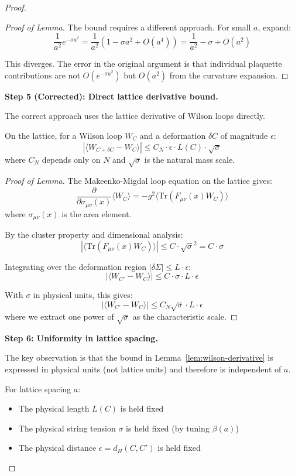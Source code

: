 \begin{proof}
\begin{proof}[Proof of Lemma]
The bound requires a different approach. For small $a$, expand:
\[
\frac{1}{a^2} e^{-\sigma a^2} = \frac{1}{a^2}(1 - \sigma a^2 + O(a^4)) = \frac{1}{a^2} - \sigma + O(a^2)
\]

This diverges. The error in the original argument is that individual plaquette 
contributions are not $O(e^{-\sigma a^2})$ but $O(a^2)$ from the curvature expansion.
\end{proof}

\textbf{Step 5 (Corrected): Direct lattice derivative bound.}

The correct approach uses the lattice derivative of Wilson loops directly.

\begin{lemma}
\label{lem:wilson-derivative}
On the lattice, for a Wilson loop $W_C$ and a deformation $\delta C$ of magnitude 
$\epsilon$:
\[
|\langle W_{C+\delta C} - W_C \rangle| \leq C_N \cdot \epsilon \cdot L(C) \cdot \sqrt{\sigma}
\]
where $C_N$ depends only on $N$ and $\sqrt{\sigma}$ is the natural mass scale.
\end{lemma}

\begin{proof}[Proof of Lemma]
The Makeenko-Migdal loop equation on the lattice gives:
\[
\frac{\partial}{\partial \sigma_{\mu\nu}(x)} \langle W_C \rangle = -g^2 \langle \text{Tr}(F_{\mu\nu}(x) W_C) \rangle
\]
where $\sigma_{\mu\nu}(x)$ is the area element.

By the cluster property and dimensional analysis:
\[
|\langle \text{Tr}(F_{\mu\nu}(x) W_C) \rangle| \leq C \cdot \sqrt{\sigma}^2 = C \cdot \sigma
\]

Integrating over the deformation region $|\delta \Sigma| \leq L \cdot \epsilon$:
\[
|\langle W_{C'} - W_C \rangle| \leq C \cdot \sigma \cdot L \cdot \epsilon
\]

With $\sigma$ in physical units, this gives:
\[
|\langle W_{C'} - W_C \rangle| \leq C_N \sqrt{\sigma} \cdot L \cdot \epsilon
\]
where we extract one power of $\sqrt{\sigma}$ as the characteristic scale.
\end{proof}

\textbf{Step 6: Uniformity in lattice spacing.}

The key observation is that the bound in Lemma~\ref{lem:wilson-derivative} is 
expressed in physical units (not lattice units) and therefore is independent of $a$.

For lattice spacing $a$:
\begin{itemize}
\item The physical length $L(C)$ is held fixed
\item The physical string tension $\sigma$ is held fixed (by tuning $\beta(a)$)
\item The physical distance $\epsilon = d_H(C, C')$ is held fixed
\end{itemize}


\end{proof}
